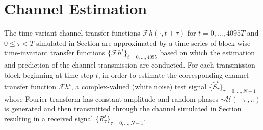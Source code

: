 \documentclass[a4paper,extrafontsizes,article]{memoir}
\begin{document}
\section{Channel Estimation}
The time-variant channel transfer functions $\mathcal{F}h(\cdot,t+\tau)$ for $t=0,\dots, 4095T$ and $0\leq \tau<T$ simulated in Section are approximated by a time series of block wise time-invariant transfer functions $\{\mathcal{F}h^t\}_{t=0,\dots, 4095}$ based on which the estimation and prediction of the channel transmission are conducted.
For each transmission block beginning at time step $t$, in order to estimate the corresponding channel transfer function $\mathcal{F}h^{t}$, a complex-valued (white noise) test signal $\{\tilde{S}_\tau^t\}_{\tau=0,\dots,N-1}$ 
whose Fourier transform has constant amplitude and random phases $\sim\mathcal{U}(-\pi,\pi)$ is generated
and then transmitted through the channel simulated in Section resulting in a received signal $\{R_\tau^t\}_{\tau=0,\dots,N-1}$.
\end{document}
